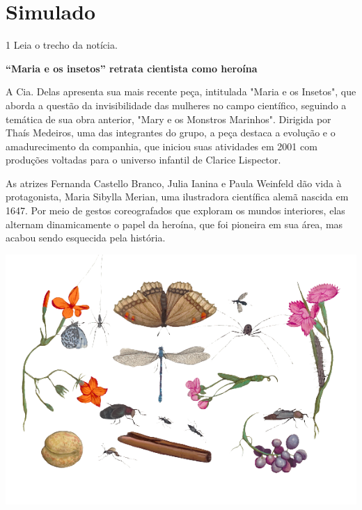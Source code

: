
\setcounter{chapter}{0}
\chapter[Simulado 1]{Simulado}

\vspace*{-1cm}

\num{1} Leia o trecho da notícia.

\enlargethispage{2\baselineskip}
\begin{myquote}

\textbf{``Maria e os insetos'' retrata cientista como heroína}

A Cia. Delas apresenta sua mais recente peça, intitulada "Maria e os Insetos", que aborda a questão da invisibilidade das mulheres no campo científico, seguindo a temática de sua obra anterior, "Mary e os Monstros Marinhos". Dirigida por Thaís Medeiros, uma das integrantes do grupo, a peça destaca a evolução e o amadurecimento da companhia, que iniciou suas atividades em 2001 com produções voltadas para o universo infantil de Clarice Lispector.

As atrizes Fernanda Castello Branco, Julia Ianina e Paula Weinfeld dão vida à protagonista, Maria Sibylla Merian, uma ilustradora científica alemã nascida em 1647. Por meio de gestos coreografados que exploram os mundos interiores, elas alternam dinamicamente o papel da heroína, que foi pioneira em sua área, mas acabou sendo esquecida pela história.

\begin{center}
\includegraphics[width=.6\textwidth]{./media/image23e.png}
\end{center}

\end{myquote}

